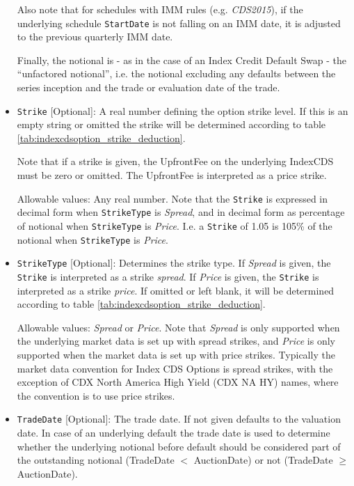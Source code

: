 \begin{itemize}
Also note that for schedules with IMM rules (e.g. \emph{CDS2015}), if the underlying schedule \lstinline!StartDate! is not falling on an IMM date, it is adjusted to the previous quarterly IMM date.

Finally, the notional is - as in the case of an Index Credit Default Swap - the ``unfactored notional'', i.e. the notional excluding any defaults between the series inception and the trade or evaluation date of the trade.

\item
\lstinline!Strike! [Optional]: A real number defining the option strike level. If this is an empty string or omitted the strike will be determined according to table \ref{tab:indexcdsoption_strike_deduction}. 

Note that if a strike is given, the UpfrontFee on the underlying IndexCDS must be zero or omitted. The UpfrontFee is interpreted as a price strike.

Allowable values: Any real number. Note that the \lstinline!Strike! is expressed in decimal form when \lstinline!StrikeType! is \emph{Spread}, and  in decimal form as percentage of notional when \lstinline!StrikeType! is \emph{Price}. I.e. a  \lstinline!Strike! of 1.05 is 105\% of the notional when \lstinline!StrikeType! is \emph{Price}.

\item
\lstinline!StrikeType! [Optional]: Determines the strike type. If \emph{Spread} is given, the \lstinline!Strike! is interpreted as a strike \emph{spread}. If \emph{Price} is given, the \lstinline!Strike! is interpreted as a strike \emph{price}. If omitted or left blank, it will be determined according to table \ref{tab:indexcdsoption_strike_deduction}. 

Allowable values: \emph{Spread} or \emph{Price}. Note that \emph{Spread} is only supported when the underlying market data is set up with spread strikes, and \emph{Price} is only supported when the market data is set up with price strikes. Typically the market data convention for Index CDS Options is spread strikes, with the exception of CDX North America High Yield (CDX NA HY) names, where the convention is to use price strikes.

\item 
\lstinline!TradeDate! [Optional]: The trade date. If not given defaults to the valuation date. In case of an underlying
default the trade date is used to determine whether the underlying notional before default should be considered part of
the outstanding notional (TradeDate $<$ AuctionDate) or not (TradeDate $\geq$ AuctionDate).
 

\end{itemize}
